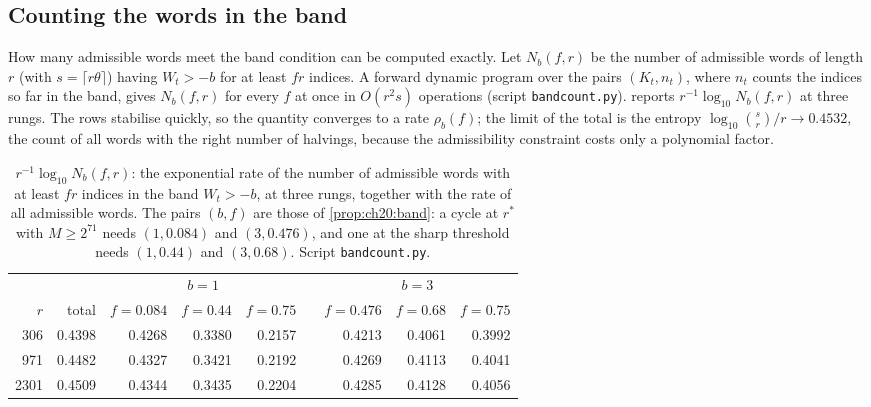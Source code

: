 \subsection{Counting the words in the band}

How many admissible words meet the band condition can be computed exactly. Let $N_b(f,r)$ be the number of admissible words of length $r$ (with $s=\lceil r\theta\rceil$) having $W_t>-b$ for at least $fr$ indices. A forward dynamic program over the pairs $(K_t,n_t)$, where $n_t$ counts the indices so far in the band, gives $N_b(f,r)$ for every $f$ at once in $O(r^2s)$ operations (script \texttt{bandcount.py}).  reports $r^{-1}\log_{10}N_b(f,r)$ at three rungs. The rows stabilise quickly, so the quantity converges to a rate $\rho_b(f)$; the limit of the total is the entropy $\log_{10}\binom{s}{r}/r\to0.4532$, the count of all words with the right number of halvings, because the admissibility constraint costs only a polynomial factor.

\begin{table}[t]
\centering
\small
\setlength{\tabcolsep}{4.5pt}
\begin{tabular}{rrrrrrrrr}
\toprule
& & \multicolumn{3}{c}{$b=1$} & & \multicolumn{3}{c}{$b=3$}\\
\cmidrule{3-5}\cmidrule{7-9}
$r$ & total & $f=0.084$ & $f=0.44$ & $f=0.75$ & & $f=0.476$ & $f=0.68$ & $f=0.75$\\
\midrule
306 & 0.4398 & 0.4268 & 0.3380 & 0.2157 & & 0.4213 & 0.4061 & 0.3992\\
971 & 0.4482 & 0.4327 & 0.3421 & 0.2192 & & 0.4269 & 0.4113 & 0.4041\\
2301 & 0.4509 & 0.4344 & 0.3435 & 0.2204 & & 0.4285 & 0.4128 & 0.4056\\
\bottomrule
\end{tabular}
\caption{$r^{-1}\log_{10}N_b(f,r)$: the exponential rate of the number of admissible words with at least $fr$ indices in the band $W_t>-b$, at three rungs, together with the rate of all admissible words. The pairs $(b,f)$ are those of \cref{prop:ch20:band}: a cycle at $r^\ast$ with $M\ge2^{71}$ needs $(1,0.084)$ and $(3,0.476)$, and one at the sharp threshold needs $(1,0.44)$ and $(3,0.68)$. Script \texttt{bandcount.py}.}
\label{tab:ch20:band}
\end{table}

